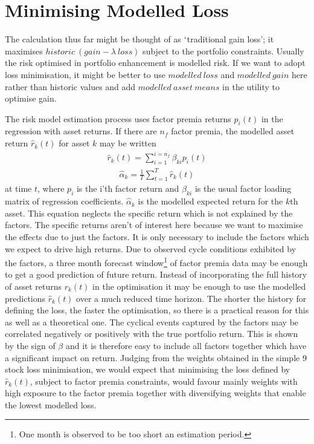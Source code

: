 \documentclass[12pt]{article}
\begin{document}
\section{Minimising Modelled Loss}
The calculation thus far might be thought of as $`$traditional gain loss'; it
maximises $historic\ (gain-\lambda\ loss)$ subject to the portfolio constraints. Usually the risk optimised in 
portfolio enhancement is modelled risk. If we want to adopt loss minimisation, it might be better to use $modelled\ loss$ and $modelled\ gain$ here rather than historic values 
and add $modelled\ asset\ means$
in the utility to optimise gain.

The risk model estimation process uses factor premia returns $p_{i}(t)$ in the regression
with asset returns. If there are $n_f$ factor premia, the modelled asset return $\hat{r}_{k}(t)$ for asset $k$ may be written
\begin{eqnarray}
    \hat{r}_{k}(t) = \sum_{i=1}^{i=n_f}\beta_{ki} p_{i}(t)
\end{eqnarray}
\begin{eqnarray}
    \hat{\alpha}_k = \frac{1}{T}\sum_{t=1}^T \hat{r}_{k}(t)
\end{eqnarray}
at time $t$, where $p_i$ is the i'th factor return and $\beta_{ki}$ is the usual factor loading matrix of regression coefficients.
$\hat{\alpha}_k$ is the modelled expected return for the $k$th asset.
This equation neglects the specific return which is not explained by the factors. The specific returns aren't of interest here because we want 
to maximise the effects due to just the factors. It is only necessary to include the factors which we expect 
to drive high returns.
Due to observed cycle conditions exhibited by the factors, a three month forecast window\footnote{One month is observed to be too short an estimation period.} of factor premia data may be enough
to get a good prediction of future return. Instead of incorporating the full history of
asset returns $r_k(t)$ in the optimisation it may be enough to use the modelled predictions
$\hat{r}_{k}(t)$ over a much reduced time horizon. The shorter the history for defining the
loss, the faster the optimisation, so there is a practical reason for this as well as
a theoretical one. The cyclical events captured by the factors may be correlated negatively or positively with 
the true portfolio return. This is shown by the sign of $\beta$ and it is therefore easy to include all factors together 
which have a significant impact on return.
Judging from the weights obtained in the simple 9 stock loss minimisation, we would expect 
that minimising the loss defined by $\hat{r}_{k}(t)$, subject to factor premia constraints, would favour mainly weights 
with high exposure to the factor premia together with diversifying weights that enable the lowest modelled loss.
\end{document}
